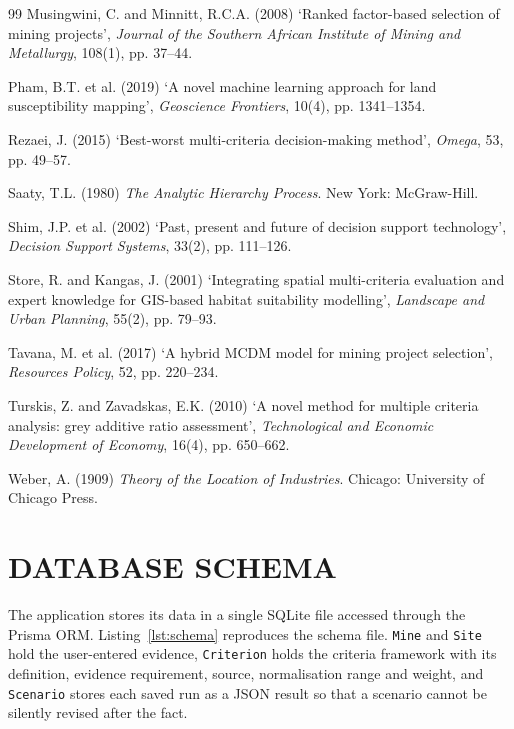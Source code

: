 \documentclass[12pt,a4paper]{report}
\begin{document}
\begin{thebibliography}{99}
Musingwini, C. and Minnitt, R.C.A. (2008) `Ranked factor-based
selection of mining projects', \textit{Journal of the Southern African
Institute of Mining and Metallurgy}, 108(1), pp. 37--44.

Pham, B.T. et al. (2019) `A novel machine learning approach for land
susceptibility mapping', \textit{Geoscience Frontiers}, 10(4), pp.
1341--1354.

Rezaei, J. (2015) `Best-worst multi-criteria decision-making method',
\textit{Omega}, 53, pp. 49--57.

Saaty, T.L. (1980) \textit{The Analytic Hierarchy Process}. New York:
McGraw-Hill.

Shim, J.P. et al. (2002) `Past, present and future of decision support
technology', \textit{Decision Support Systems}, 33(2), pp. 111--126.

Store, R. and Kangas, J. (2001) `Integrating spatial multi-criteria
evaluation and expert knowledge for GIS-based habitat suitability
modelling', \textit{Landscape and Urban Planning}, 55(2), pp. 79--93.

Tavana, M. et al. (2017) `A hybrid MCDM model for mining project
selection', \textit{Resources Policy}, 52, pp. 220--234.

Turskis, Z. and Zavadskas, E.K. (2010) `A novel method for multiple
criteria analysis: grey additive ratio assessment',
\textit{Technological and Economic Development of Economy}, 16(4), pp.
650--662.

Weber, A. (1909) \textit{Theory of the Location of Industries}.
Chicago: University of Chicago Press.

\end{thebibliography}

\appendix

\chapter{DATABASE SCHEMA}
The application stores its data in a single SQLite file accessed through
the Prisma ORM. Listing~\ref{lst:schema} reproduces the schema file.
\texttt{Mine} and \texttt{Site} hold the user-entered evidence,
\texttt{Criterion} holds the criteria framework with its definition,
evidence requirement, source, normalisation range and weight, and
\texttt{Scenario} stores each saved run as a JSON result so that a
scenario cannot be silently revised after the fact.
\end{document}
